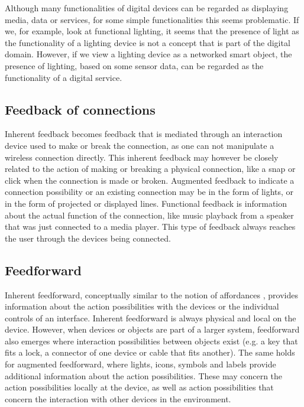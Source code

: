 Although many functionalities of digital devices can be regarded as displaying media, data or services, for some simple functionalities this seems problematic. If we, for example, look at functional lighting, it seems that the presence of light as the functionality of a lighting device is not a concept that is part of the digital domain. However, if we view a lighting device as a networked smart object, the presence of lighting, based on some sensor data, can be regarded as the functionality of a digital service.


\subsection{Feedback of connections}

Inherent feedback becomes feedback that is mediated through an interaction device used to make or break the connection, as one can not manipulate a wireless connection directly. This inherent feedback may however be closely related to the action of making or breaking a physical connection, like a snap or click when the connection is made or broken. Augmented feedback to indicate a connection possibility or an existing connection may be in the form of lights, or in the form of projected or displayed lines. Functional feedback is information about the actual function of the connection, like music playback from a speaker that was just connected to a media player. This type of feedback always reaches the user through the devices being connected. 

\subsection{Feedforward}
Inherent feedforward, conceptually similar to the notion of affordances  \cite{Norman1998}, provides information about the action possibilities with the devices or the individual controls of an interface. Inherent feedforward is always physical and local on the device. However, when devices or objects are part of a larger system, feedforward also emerges where interaction possibilities between objects exist (e.g. a key that fits a lock, a connector of one device or cable that fits another). The same holds for augmented feedforward, where lights, icons, symbols and labels provide additional information about the action possibilities. These may concern the action possibilities locally at the device, as well as action possibilities that concern the interaction with other devices in the environment. 

